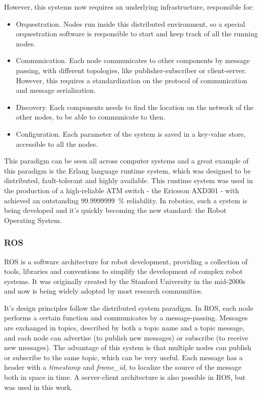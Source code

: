 However, this systems now requires an underlying infrastructure, responsible for:

\begin{itemize}
    \item Orquestration. Nodes run inside this distributed environment, so a special orquestration software is responsible to start and keep track of all the running nodes.
    \item Communication. Each node communicates to other components by message passing, with different topologies, like publisher-subscriber or client-server. However, this requires a standardization on the protocol of communication and message serialization.
    \item Discovery. Each components needs to find the location on the network of the other nodes, to be able to communicate to then.
    \item Configuration. Each parameter of the system is saved in a key-value store, accessible to all the nodes.
\end{itemize}

This paradigm can be seen all across computer systems and a great example of this paradigm is the Erlang language runtime system, which was designed to be distributed, fault-tolerant and highly available. This runtime system was used in the production of a high-reliable ATM switch - the Ericsson AXD301 - with achieved an outstanding \SI{99.9999999}{\percent} reliability. In robotics, such a system is being developed and it's quickly becoming the new standard: the Robot Operating System. 

\subsubsection{ROS}

ROS is a software architecture for robot development, providing a collection of tools, libraries and conventions to simplify the development of complex robot systems. It was originally created by the Stanford University in the mid-2000s and now is being widely adopted by most research communities.

It's design principles follow the distributed system paradigm. In ROS, each node performs a certain function and communicates by a message-passing. Messages are exchanged in topics, described by both a topic name and a topic message, and each node can advertise (to publish new messages) or subscribe (to receive new messages). The advantage of this system is that multiple nodes can publish or subscribe to the same topic, which can be very useful. Each message has a header with a \textit{timestamp} and \textit{frame\_id}, to localize the source of the message both in space in time. A server-client architecture is also possible in ROS, but was used in this work.

